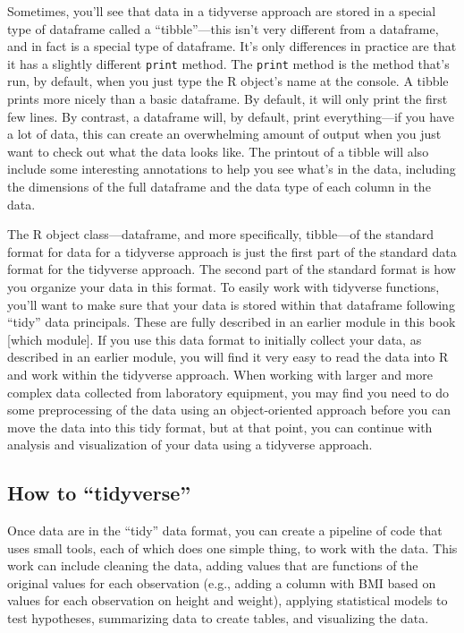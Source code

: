 \documentclass[]{tufte-book}
\begin{document}
Sometimes, you'll see that data in a tidyverse approach are stored in a special
type of dataframe called a ``tibble''---this isn't very different from a
dataframe, and in fact is a special type of dataframe. It's only differences in
practice are that it has a slightly different \texttt{print} method. The \texttt{print} method
is the method that's run, by default, when you just type the R object's name
at the console. A tibble prints more nicely than a basic dataframe. By default,
it will only print the first few lines. By contrast, a dataframe will, by default,
print everything---if you have a lot of data, this can create an overwhelming
amount of output when you just want to check out what the data looks like. The
printout of a tibble will also include some interesting annotations to help you
see what's in the data, including the dimensions of the full dataframe and the
data type of each column in the data.

The R object class---dataframe, and more specifically, tibble---of the standard
format for data for a tidyverse approach is just the first part of the standard
data format for the tidyverse approach. The second part of the standard format is
how you organize your data in this format. To easily work with tidyverse functions,
you'll want to make sure that your data is stored within that dataframe following
``tidy'' data principals. These are fully described in an earlier module in this
book {[}which module{]}. If you use this data format to initially collect your
data, as described in an earlier module, you will find it very easy to read the
data into R and work within the tidyverse approach. When working with larger and
more complex data collected from laboratory equipment, you may find you need to
do some preprocessing of the data using an object-oriented approach before you
can move the data into this tidy format, but at that point, you can continue with
analysis and visualization of your data using a tidyverse approach.

\hypertarget{how-to-tidyverse}{%
\subsection{How to ``tidyverse''}\label{how-to-tidyverse}}

Once data are in the ``tidy'' data format, you can create a pipeline of code that
uses small tools, each of which does one simple thing, to work with the data.
This work can include cleaning the data, adding values that are functions of the
original values for each observation (e.g., adding a column with BMI based on
values for each observation on height and weight), applying statistical models to
test hypotheses, summarizing data to create tables, and visualizing the data.
\end{document}
